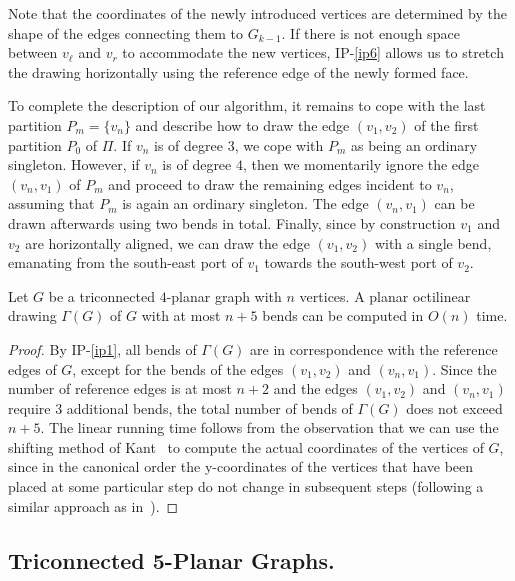 \documentclass[a4paper,twoside,11pt]{article}
\begin{document}
Note that the coordinates of the newly introduced vertices are
determined by the shape of the edges connecting them to $G_{k-1}$.
If there is not enough space between $v_\ell$ and $v_r$ to
accommodate the new vertices, IP-\ref{ip6} allows us to stretch the
drawing horizontally using the reference edge of the newly formed
face.

To complete the description of our algorithm, it remains to cope
with the last partition $P_m = \{v_n\}$ and describe how to draw the
edge $(v_1,v_2)$ of the first partition $P_0$ of $\Pi$. If $v_n$ is
of degree $3$, we cope with $P_m$ as being an ordinary singleton.
However, if $v_n$ is of degree $4$, then we momentarily ignore the
edge $(v_n,v_1)$ of $P_m$ and proceed to draw the remaining edges
incident to $v_n$, assuming that $P_m$ is again an ordinary
singleton. The edge $(v_n,v_1)$ can be drawn afterwards using two
bends in total. Finally, since by construction $v_1$ and $v_2$ are
horizontally aligned, we can draw the edge $(v_1,v_2)$ with a single
bend, emanating from the south-east port of $v_1$ towards the
south-west port of $v_2$.

\begin{theorem}
Let $G$ be a triconnected $4$-planar graph with $n$ vertices. A
planar octilinear drawing $\Gamma(G)$ of $G$ with at most $n+5$
bends can be computed in $O(n)$ time.
\label{thm:4ub}
\end{theorem}
\begin{proof}
By IP-\ref{ip1}, all bends of $\Gamma(G)$ are in correspondence with
the reference edges of $G$, except for the bends of the edges
$(v_1,v_2)$ and $(v_n,v_1)$. Since the number of reference edges is
at most $n+2$ and the edges $(v_1,v_2)$ and $(v_n,v_1)$ require $3$
additional bends, the total number of bends of $\Gamma(G)$ does not
exceed $n+5$. The linear running time follows from the observation
that we can use the shifting method of Kant~\cite{Kant92} to compute
the actual coordinates of the vertices of $G$, since in the
canonical order the y-coordinates of the vertices that have been
placed at some particular step do not change in subsequent steps
(following a similar approach as in~\cite{BGKK14}).
\end{proof}

\subsection{Triconnected 5-Planar Graphs.}
\label{sec:5planar}
\end{document}
